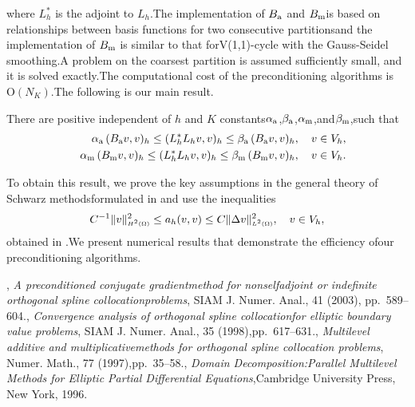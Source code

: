 \documentclass{report}
\begin{document}
where $L_h^*$ is the adjoint to $L_h$.The implementation of $B_{\textup{\scriptsize a}}$ and $B_{\textup{\scriptsize m}}$is based on relationships between basis functions for two consecutive partitionsand the implementation of $B_{\textup{\scriptsize m}}$ is similar to that forV(1,1)-cycle with the Gauss-Seidel smoothing.A problem on the coarsest partition is assumed sufficiently small,
and it is solved exactly.The computational cost of the preconditioning algorithms is $\mbox{O}(N_K)$.The following is our main result.\begin{theorem}There are positive independent of $h$ and $K$ constants$\alpha_{\textup{\scriptsize a}}$,$\beta_{\textup{\scriptsize a}}$,$\alpha_{\textup{\scriptsize m}}$,and$\beta_{\textup{\scriptsize m}}$,such that\begin{eqnarray}\label{eq:spectral_equiv}&&\alpha_{\textup{\scriptsize a}}\,
(B_{\textup{\scriptsize a}}v,v)_h\leq (L_h^*L_hv,v)_h \leq\beta_{\textup{\scriptsize a}}\,
(B_{\textup{\scriptsize a}}v,v)_h,\quad v\in V_h,\\\nonumber&&\alpha_{\textup{\scriptsize m}}\,
(B_{\textup{\scriptsize m}}v,v)_h\leq (L_h^*L_hv,v)_h \leq\beta_{\textup{\scriptsize m}}\,
(B_{\textup{\scriptsize m}}v,v)_h,\quad v\in V_h.\end{eqnarray}\end{theorem}To obtain this result,
we prove the key assumptions in the general theory of Schwarz methodsformulated in \cite{SBG_1996} and use the inequalities\[C^{-1}\|v\|_{\mbox{$\scriptscriptstyle H^{2}(\Omega)$}}^2\leq a_h(v,v)\leq C\|\Delta v\|_{\mbox{$\scriptscriptstyle L^{2}(\Omega)$}}^2,\quad v\in V_h,\]obtained in \cite{Bialecki_1998}.We present numerical results that demonstrate the efficiency ofour preconditioning algorithms.\begin{thebibliography}{1},
{\em A preconditioned conjugate gradientmethod for nonselfadjoint or indefinite orthogonal spline collocationproblems},
SIAM J.
Numer.
Anal.,
41 (2003),
pp.~589--604.,
{\em Convergence analysis of orthogonal spline collocationfor elliptic boundary value problems},
SIAM J.
Numer.
Anal.,
35 (1998),pp.~617--631.,
{\em Multilevel additive and multiplicativemethods for orthogonal spline collocation problems},
Numer.
Math.,
77 (1997),pp.~35--58.,
{\em Domain Decomposition:Parallel Multilevel Methods for Elliptic Partial Differential Equations},Cambridge University Press,
New York,
1996.\end{thebibliography}
\end{document}
